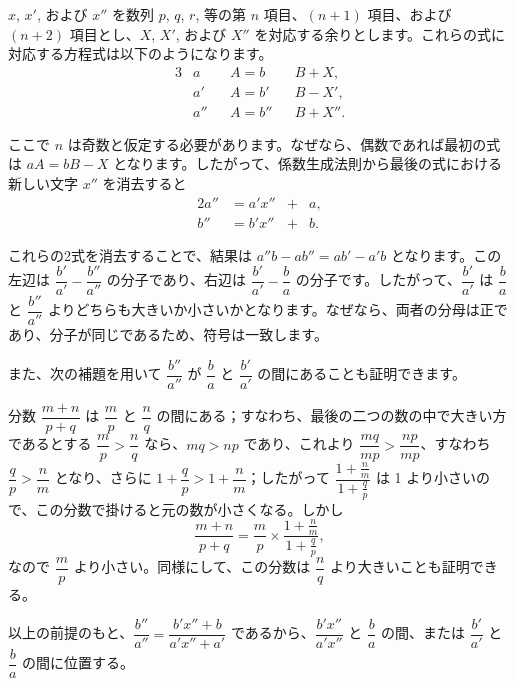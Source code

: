 \documentclass[a4paper,11pt,openany]{ltjsbook}
\begin{document}
$x$, $x'$, および $x''$ を数列 $p$, $q$, $r$, 等の第 $n$ 項目、$(n+1)$ 項目、および $(n+2)$ 項目とし、$X$, $X'$, および $X''$ を対応する余りとします。これらの式に対応する方程式は以下のようになります。
\begin{alignat*}{3}
&a && A = b & & B + X, \\
&a' && A = b' & & B - X', \\
&a''&& A = b'' & & B + X''.
\end{alignat*}

ここで $n$ は奇数と仮定する必要があります。なぜなら、偶数であれば最初の式は $aA = bB - X$ となります。したがって、係数生成法則から最後の式における新しい文字 $x''$ を消去すると
\begin{alignat*}{2}
a'' &= a'x'' &+& a, \\
b'' &= b'x'' &+& b.
\end{alignat*}

これらの2式を消去することで、結果は $a''b - ab'' = ab' - a'b$ となります。この左辺は $\dfrac{b'}{a'} - \dfrac{b''}{a''}$ の分子であり、右辺は $\dfrac{b'}{a'} - \dfrac{b}{a}$ の分子です。したがって、$\dfrac{b'}{a'}$ は $\dfrac{b}{a}$ と $\dfrac{b''}{a''}$ よりどちらも大きいか小さいかとなります。なぜなら、両者の分母は正であり、分子が同じであるため、符号は一致します。

また、次の補題を用いて $\dfrac{b''}{a''}$ が $\dfrac{b}{a}$ と $\dfrac{b'}{a'}$ の間にあることも証明できます。

分数 \(\dfrac{m + n}{p + q}\) は \(\dfrac{m}{p}\) と \(\dfrac{n}{q}\) の間にある；すなわち、最後の二つの数の中で大きい方であるとする \(\dfrac{m}{p} > \dfrac{n}{q}\) なら、\(mq > np\) であり、これより \(\dfrac{mq}{mp} > \dfrac{np}{mp}\)、すなわち \(\dfrac{q}{p} > \dfrac{n}{m}\) となり、さらに \(1 + \dfrac{q}{p} > 1 + \dfrac{n}{m}\)；したがって \(\dfrac{1 + \frac{n}{m}}{1 + \frac{q}{p}}\) は 1 より小さいので、この分数で掛けると元の数が小さくなる。しかし
\[
\dfrac{m + n}{p + q} = \dfrac{m}{p} × \dfrac{1 + \frac{n}{m}}{1 + \frac{q}{p}},
\]
なので \(\dfrac{m}{p}\) より小さい。同様にして、この分数は \(\dfrac{n}{q}\) より大きいことも証明できる。

以上の前提のもと、\(\dfrac{b''}{a''} = \dfrac{b'x'' + b}{a'x'' + a'}\) であるから、\(\dfrac{b'x''}{a'x''}\) と \(\dfrac{b}{a}\) の間、または \(\dfrac{b'}{a'}\) と \(\dfrac{b}{a}\) の間に位置する。
\end{document}
